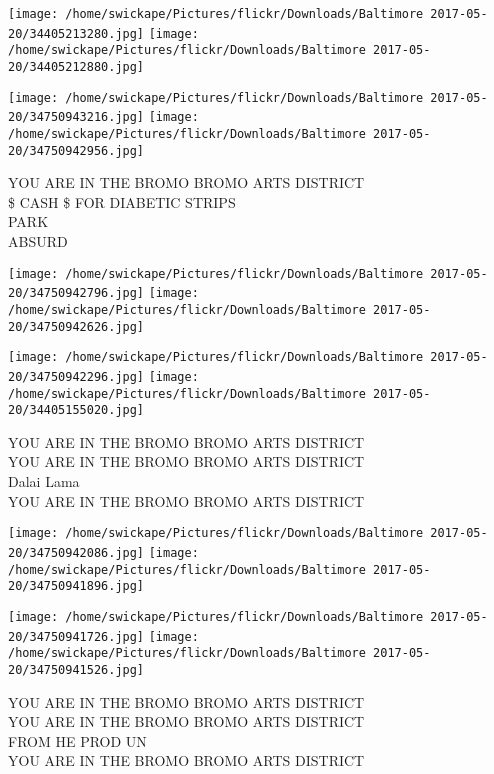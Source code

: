 \documentclass[10pt,letterpaper]{article}
\begin{document}
\texttt{[image: /home/swickape/Pictures/flickr/Downloads/Baltimore 2017-05-20/34405213280.jpg]}
\texttt{[image: /home/swickape/Pictures/flickr/Downloads/Baltimore 2017-05-20/34405212880.jpg]}

\texttt{[image: /home/swickape/Pictures/flickr/Downloads/Baltimore 2017-05-20/34750943216.jpg]}
\texttt{[image: /home/swickape/Pictures/flickr/Downloads/Baltimore 2017-05-20/34750942956.jpg]}

YOU ARE IN THE BROMO BROMO ARTS DISTRICT\\
\$ CASH \$ FOR DIABETIC STRIPS\\
PARK\\
ABSURD\\
\pagebreak

\texttt{[image: /home/swickape/Pictures/flickr/Downloads/Baltimore 2017-05-20/34750942796.jpg]}
\texttt{[image: /home/swickape/Pictures/flickr/Downloads/Baltimore 2017-05-20/34750942626.jpg]}

\texttt{[image: /home/swickape/Pictures/flickr/Downloads/Baltimore 2017-05-20/34750942296.jpg]}
\texttt{[image: /home/swickape/Pictures/flickr/Downloads/Baltimore 2017-05-20/34405155020.jpg]}

YOU ARE IN THE BROMO BROMO ARTS DISTRICT\\
YOU ARE IN THE BROMO BROMO ARTS DISTRICT\\
Dalai Lama\\
YOU ARE IN THE BROMO BROMO ARTS DISTRICT\\
\pagebreak

\texttt{[image: /home/swickape/Pictures/flickr/Downloads/Baltimore 2017-05-20/34750942086.jpg]}
\texttt{[image: /home/swickape/Pictures/flickr/Downloads/Baltimore 2017-05-20/34750941896.jpg]}

\texttt{[image: /home/swickape/Pictures/flickr/Downloads/Baltimore 2017-05-20/34750941726.jpg]}
\texttt{[image: /home/swickape/Pictures/flickr/Downloads/Baltimore 2017-05-20/34750941526.jpg]}

YOU ARE IN THE BROMO BROMO ARTS DISTRICT\\
YOU ARE IN THE BROMO BROMO ARTS DISTRICT\\
FROM HE PROD UN\\
YOU ARE IN THE BROMO BROMO ARTS DISTRICT\\
\pagebreak
\end{document}
